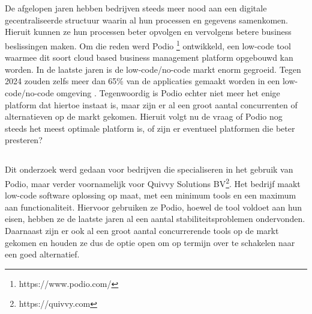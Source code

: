 
\chapter{}%
\label{ch:inleiding} %

De afgelopen jaren hebben bedrijven steeds meer nood aan een digitale gecentraliseerde structuur waarin al hun processen en gegevens samenkomen. Hieruit kunnen ze hun processen beter opvolgen en vervolgens betere business beslissingen maken. Om die reden werd Podio \footnote{https://www.podio.com/} ontwikkeld, een low-code tool waarmee dit soort cloud based business management platform opgebouwd kan worden. In de laatste jaren is de low-code/no-code markt enorm gegroeid. Tegen 2024 zouden zelfs meer dan 65\% van de applicaties gemaakt worden in een low-code/no-code omgeving \autocite{Costello2021}. Tegenwoordig is Podio echter niet meer het enige platform dat hiertoe instaat is, maar zijn er al een groot aantal concurrenten of alternatieven op de markt gekomen. Hieruit volgt nu de vraag of Podio nog steeds het meest optimale platform is, of zijn er eventueel platformen die beter presteren? 

\section{}%
\label{sec:probleemstelling} %


Dit onderzoek werd gedaan voor bedrijven die specialiseren in het gebruik van Podio, maar verder voornamelijk voor Quivvy Solutions BV\footnote{https://quivvy.com}. Het bedrijf maakt low-code software oplossing op maat, met een minimum tools en een maximum aan functionaliteit. Hiervoor gebruiken ze Podio, hoewel de tool voldoet aan hun eisen, hebben ze de laatste jaren al een aantal stabiliteitsproblemen ondervonden. Daarnaast zijn er ook al een groot aantal concurrerende tools op de markt gekomen en houden ze dus de optie open om op termijn over te schakelen naar een goed alternatief. 

